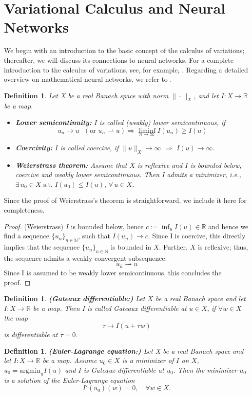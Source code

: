 \documentclass[draft,12pt,openany]{book}
\newcommand{\R}{\mathbb{R}}
\theoremstyle{plainnormal}
\newtheorem{definition}[theorem]{Definition}
\theoremstyle{remark}
\begin{document}
\section{Variational Calculus and Neural Networks}
We begin with an introduction to the basic concept of the calculus of variations; thereafter, we will discuss its connections to neural networks. For a complete introduction to the calculus of variations, see, for example, \cite{Dacorogna}. Regarding a detailed overview on mathematical neural networks, we refer to \cite{e2020mathematicalunderstandingneuralnetworkbased}.
\begin{definition}
Let X be a real Banach space with norm $\|\cdot\|_X$, and let $I: X\rightarrow\R$ be a map.
\begin{itemize}
    \item \textbf{Lower semicontinuity:} $I$ is called \emph{(weakly) lower semicontinuous}, if $$u_n \rightarrow u\text{  } (\text{or }u_n \rightharpoonup u) \Rightarrow \liminf_{n\rightarrow\infty} I(u_n)\geq I(u)$$
    \item \textbf{Coercivity:} $I$ is called \emph{coercive}, if $\|u\|_X\rightarrow \infty$ $\Rightarrow$ $ I(u) \rightarrow \infty$.
    \item \textbf{Weierstrass theorem:} Assume that $X$ is reflexive and $I$ is bounded below, coercive and weakly lower semicontinuous. Then I admits a minimizer, i.e., ~$\exists\, u_0 \in X \text{ s.t. } I(u_0) \leq I(u),\, \forall\, u \in X$.
    \label{Weierstrass}
\end{itemize}
    
\end{definition}
Since the proof of Weierstrass’s theorem is straightforward, we include it here for completeness.\begin{proof}{(Weierstrass)}
    $I$ is bounded below, hence $c:= \inf_u I(u) \in \R$ and hence we find a sequence $\{u_n\}_{n\in\mathbb{N}}$, such that $I(u_n)\rightarrow c$. Since I is coercive, this directly implies that the sequence $\{u_n\}_{n\in\mathbb{N}}$ is bounded in $X$. Further, $X$ is reflexive; thus, the sequence admits a weakly convergent subsequence: $$u_{\hat{n}} \rightharpoonup u$$
    Since I is assumed to be weakly lower semicontinuous, this concludes the proof. 
\end{proof}
\begin{definition}\textbf{(Gateaux differentiable:)}
    Let $X$ be a real Banach space and let \mbox{$I: X\rightarrow\R$} be a map. Then I is called \emph{Gateaux differentiable} at $u\in X$, if $\forall w\in X$ the map $$\tau \mapsto I(u + \tau w)$$ is differentiable at $\tau = 0$.
\end{definition}
\begin{definition}\label{EL_eq}\textbf{(Euler-Lagrange equation:)}
Let X be a real Banach space and let \mbox{$I: X\rightarrow\R$} be a map. Assume $u_0\in X$ is a minimizer of $I$ on $X$, $u_0 = \mathrm{argmin}_u I(u)$ and $I$ is Gateaux differentiable at $u_0$. Then the minimizer $u_0$ is a solution of the \emph{Euler-Lagrange equation} $$I'(u_0)(w) = 0, \quad \forall w \in X.$$
\end{definition}
\end{document}
